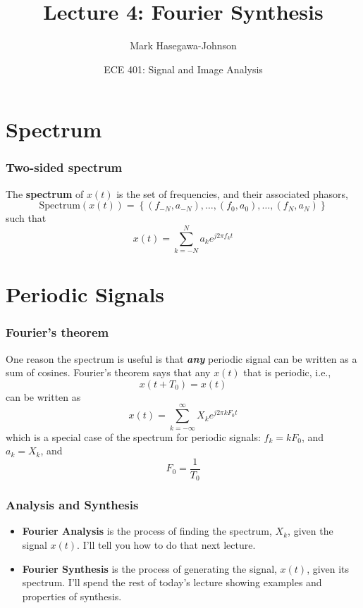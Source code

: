\documentclass{beamer}
\title{Lecture 4: Fourier Synthesis}
\author{Mark Hasegawa-Johnson}
\date{ECE 401: Signal and Image Analysis}
\begin{document}
\begin{frame}
  \maketitle
\end{frame}

\begin{frame}
  \tableofcontents
\end{frame}

\section[Spectrum]{Spectrum}
\setcounter{subsection}{1}

\begin{frame}
  \frametitle{Two-sided spectrum}

  The {\bf spectrum} of $x(t)$ is the set of frequencies, and their
  associated phasors,
  \[
  \mbox{Spectrum}\left( x(t) \right) =
  \left\{ (f_{-N},a_{-N}), \ldots, (f_0,a_0), \ldots, (f_N,a_N) \right\}
  \]
  such that
  \[
  x(t) = \sum_{k=-N}^N a_ke^{j2\pi f_kt}
  \]
\end{frame}

\section[Periodic]{Periodic Signals}
\setcounter{subsection}{1}

\begin{frame}
  \frametitle{Fourier's theorem}

  One reason the spectrum is useful is that {\bf\em any} periodic
  signal can be written as a sum of cosines.  Fourier's theorem says that
  any $x(t)$ that is periodic, i.e.,
  \[
  x(t+T_0) = x(t)
  \]
  can be written as
  \[
  x(t) = \sum_{k=-\infty}^\infty X_k e^{j2\pi k F_0 t}
  \]
  which is a special case of the spectrum for periodic signals:
  $f_k=kF_0$, and $a_k=X_k$, and
  \[
  F_0 = \frac{1}{T_0}
  \]
\end{frame}

\begin{frame}
  \frametitle{Analysis and Synthesis}

  \begin{itemize}
  \item {\bf Fourier Analysis} is the process of finding the spectrum,
    $X_k$, given the signal $x(t)$.  I'll tell you how to do that next lecture.
  \item {\bf Fourier Synthesis} is the process of generating the
    signal, $x(t)$, given its spectrum.  I'll spend the rest of
    today's lecture showing examples and properties of synthesis.
  \end{itemize}
\end{frame}
\end{document}
